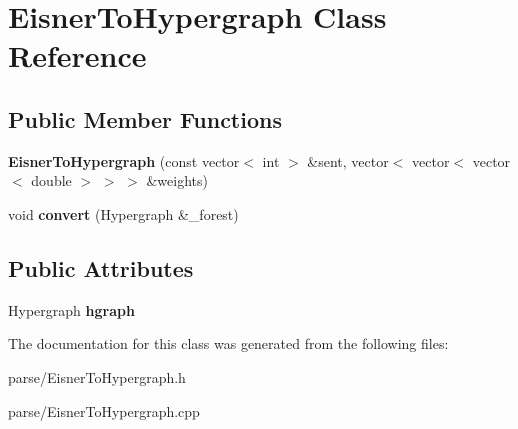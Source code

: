\hypertarget{classEisnerToHypergraph}{
\section{EisnerToHypergraph Class Reference}
\label{classEisnerToHypergraph}
}
\subsection*{Public Member Functions}
\begin{DoxyCompactItemize}
\item 
\hypertarget{classEisnerToHypergraph_ac4c11a966298244ad74965dd35596c4c}{
{\bfseries EisnerToHypergraph} (const vector$<$ int $>$ \&sent, vector$<$ vector$<$ vector$<$ double $>$ $>$ $>$ \&weights)}
\label{classEisnerToHypergraph_ac4c11a966298244ad74965dd35596c4c}

\item 
\hypertarget{classEisnerToHypergraph_a8344d534c1b3d5f2795578c771fe4d31}{
void {\bfseries convert} (Hypergraph \&\_\-forest)}
\label{classEisnerToHypergraph_a8344d534c1b3d5f2795578c771fe4d31}

\end{DoxyCompactItemize}
\subsection*{Public Attributes}
\begin{DoxyCompactItemize}
\item 
\hypertarget{classEisnerToHypergraph_a47df02a8804876cc0e33b55681b9a2f0}{
Hypergraph {\bfseries hgraph}}
\label{classEisnerToHypergraph_a47df02a8804876cc0e33b55681b9a2f0}

\end{DoxyCompactItemize}


The documentation for this class was generated from the following files:\begin{DoxyCompactItemize}
\item 
parse/EisnerToHypergraph.h\item 
parse/EisnerToHypergraph.cpp\end{DoxyCompactItemize}
